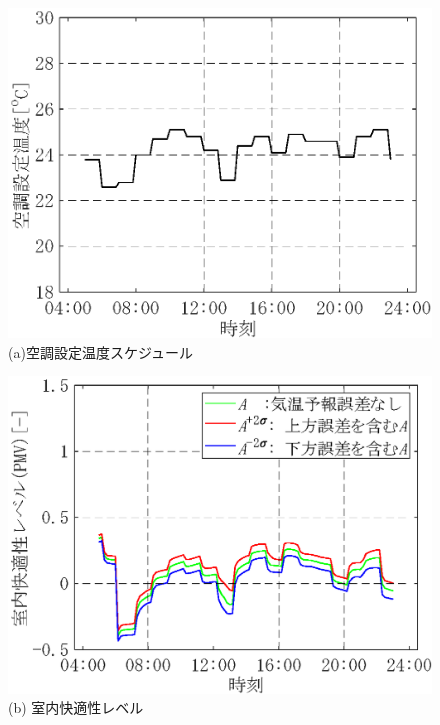\begin{figure}[htbp]
    \begin{center}
        \begin{minipage}{0.5\textwidth}
            \begin{center}
                \includegraphics[width=1\textwidth,keepaspectratio=true]{fig/robust_result_schedule_4obj_setting.eps}\\(a)空調設定温度スケジュール
            \end{center}
        \end{minipage}
        \begin{minipage}{0.5\textwidth}
            \begin{center}
                \includegraphics[width=1\textwidth,keepaspectratio=true]{fig/robust_result_schedule_4obj_comfort.eps}\\(b) 室内快適性レベル

\end{center}
\end{minipage}
\end{center}
\end{figure}
